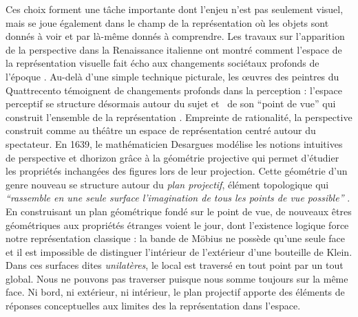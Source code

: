 Ces choix forment une t\^ache importante dont l{\textquoteright}enjeu n{\textquoteright}est pas seulement visuel, mais se joue également dans le champ de la représentation o\`u les objets sont donnés à voir et par là-m\^eme donnés à comprendre. Les travaux sur l{\textquoteright}apparition de la perspective dans la Renaissance italienne ont montré comment l{\textquoteright}espace de la représentation visuelle fait écho aux changements sociétaux profonds de l{\textquoteright}époque \citep{Raynaud2005}. Au-delà d{\textquoteright}une simple technique picturale, les {\oe}uvres des peintres du Quattrecento témoignent de changements profonds dans la perception : l{\textquoteright}espace perceptif se structure désormais autour du sujet et \ de son {\textquotedblleft}point de vue{\textquotedblright} qui construit l{\textquoteright}ensemble de la représentation \citep{Damisch1999}. Empreinte de rationalité, la perspective construit comme au thé\^atre un espace de représentation centré autour du spectateur. En 1639, le mathématicien Desargues modélise les notions intuitives de perspective et d{\textquotesingle}horizon gr\^ace à la géométrie projective qui permet d{\textquoteright}étudier les propriétés inchangées des figures lors de leur projection. Cette géométrie d{\textquoteright}un genre nouveau se structure autour du \textit{plan projectif}, élément topologique qui \textit{{\textquotedblleft}rassemble en une seule surface l{\textquoteright}imagination de tous les points de vue possible{\textquotedblright} }\citep{Petit1999}. En construisant un plan géométrique fondé sur le point de vue, de nouveaux \^etres géométriques aux propriétés étranges voient le jour, dont l{\textquoteright}existence logique force notre représentation classique : la bande de M\"obius ne possède qu{\textquoteright}une seule face et il est impossible de distinguer l{\textquoteright}intérieur de l{\textquoteright}extérieur d{\textquoteright}une bouteille de Klein. Dans ces surfaces dites \textit{unilatères}, le local est traversé en tout point par un tout global. Nous ne pouvons pas traverser puisque nous somme toujours sur la m\^eme face. Ni bord, ni extérieur, ni intérieur, le plan projectif apporte des éléments de réponses conceptuelles aux limites des la représentation dans l{\textquoteright}espace.

